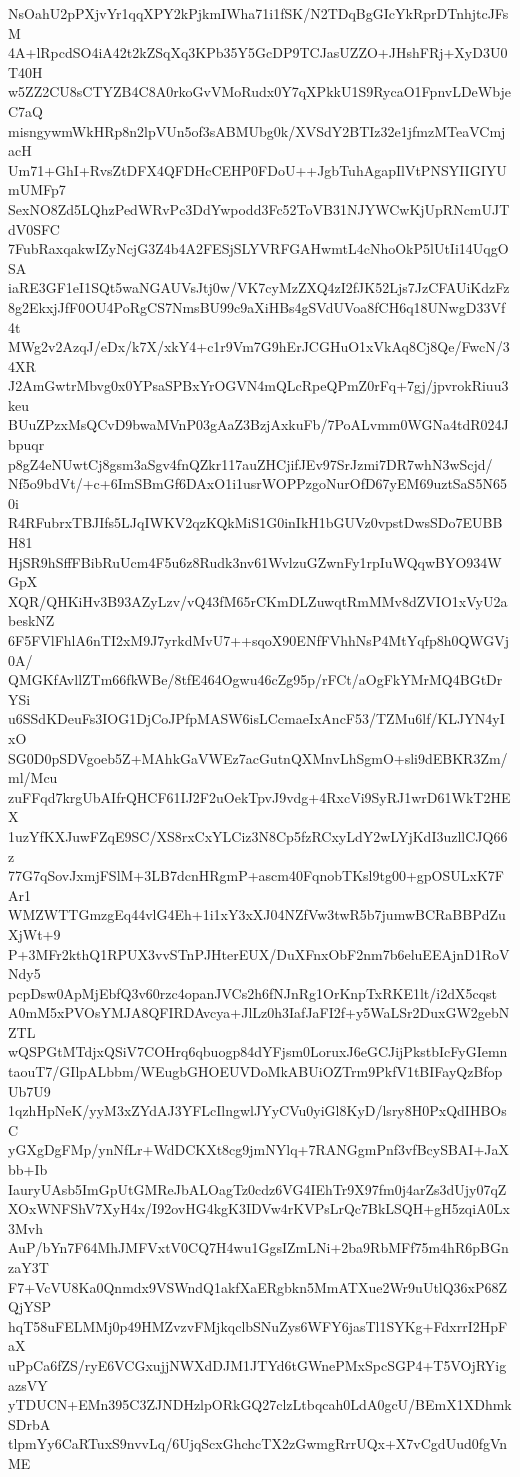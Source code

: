 NsOahU2pPXjvYr1qqXPY2kPjkmIWha71i1fSK/N2TDqBgGIcYkRprDTnhjtcJFsM
4A+lRpcdSO4iA42t2kZSqXq3KPb35Y5GcDP9TCJasUZZO+JHshFRj+XyD3U0T40H
w5ZZ2CU8sCTYZB4C8A0rkoGvVMoRudx0Y7qXPkkU1S9RycaO1FpnvLDeWbjeC7aQ
misngywmWkHRp8n2lpVUn5of3sABMUbg0k/XVSdY2BTIz32e1jfmzMTeaVCmjacH
Um71+GhI+RvsZtDFX4QFDHcCEHP0FDoU++JgbTuhAgapIlVtPNSYIIGIYUmUMFp7
SexNO8Zd5LQhzPedWRvPc3DdYwpodd3Fc52ToVB31NJYWCwKjUpRNcmUJTdV0SFC
7FubRaxqakwIZyNcjG3Z4b4A2FESjSLYVRFGAHwmtL4cNhoOkP5lUtIi14UqgOSA
iaRE3GF1eI1SQt5waNGAUVsJtj0w/VK7cyMzZXQ4zI2fJK52Ljs7JzCFAUiKdzFz
8g2EkxjJfF0OU4PoRgCS7NmsBU99c9aXiHBs4gSVdUVoa8fCH6q18UNwgD33Vf4t
MWg2v2AzqJ/eDx/k7X/xkY4+c1r9Vm7G9hErJCGHuO1xVkAq8Cj8Qe/FwcN/34XR
J2AmGwtrMbvg0x0YPsaSPBxYrOGVN4mQLcRpeQPmZ0rFq+7gj/jpvrokRiuu3keu
BUuZPzxMsQCvD9bwaMVnP03gAaZ3BzjAxkuFb/7PoALvmm0WGNa4tdR024Jbpuqr
p8gZ4eNUwtCj8gsm3aSgv4fnQZkr117auZHCjifJEv97SrJzmi7DR7whN3wScjd/
Nf5o9bdVt/+c+6ImSBmGf6DAxO1i1usrWOPPzgoNurOfD67yEM69uztSaS5N650i
R4RFubrxTBJIfs5LJqIWKV2qzKQkMiS1G0inIkH1bGUVz0vpstDwsSDo7EUBBH81
HjSR9hSffFBibRuUcm4F5u6z8Rudk3nv61WvlzuGZwnFy1rpIuWQqwBYO934WGpX
XQR/QHKiHv3B93AZyLzv/vQ43fM65rCKmDLZuwqtRmMMv8dZVIO1xVyU2abeskNZ
6F5FVlFhlA6nTI2xM9J7yrkdMvU7++sqoX90ENfFVhhNsP4MtYqfp8h0QWGVj0A/
QMGKfAvllZTm66fkWBe/8tfE464Ogwu46cZg95p/rFCt/aOgFkYMrMQ4BGtDrYSi
u6SSdKDeuFs3IOG1DjCoJPfpMASW6isLCcmaeIxAncF53/TZMu6lf/KLJYN4yIxO
SG0D0pSDVgoeb5Z+MAhkGaVWEz7acGutnQXMnvLhSgmO+sli9dEBKR3Zm/ml/Mcu
zuFFqd7krgUbAIfrQHCF61IJ2F2uOekTpvJ9vdg+4RxcVi9SyRJ1wrD61WkT2HEX
1uzYfKXJuwFZqE9SC/XS8rxCxYLCiz3N8Cp5fzRCxyLdY2wLYjKdI3uzllCJQ66z
77G7qSovJxmjFSlM+3LB7dcnHRgmP+ascm40FqnobTKsl9tg00+gpOSULxK7FAr1
WMZWTTGmzgEq44vlG4Eh+1i1xY3xXJ04NZfVw3twR5b7jumwBCRaBBPdZuXjWt+9
P+3MFr2kthQ1RPUX3vvSTnPJHterEUX/DuXFnxObF2nm7b6eluEEAjnD1RoVNdy5
pcpDsw0ApMjEbfQ3v60rzc4opanJVCs2h6fNJnRg1OrKnpTxRKE1lt/i2dX5cqst
A0mM5xPVOsYMJA8QFIRDAvcya+JlLz0h3IafJaFI2f+y5WaLSr2DuxGW2gebNZTL
wQSPGtMTdjxQSiV7COHrq6qbuogp84dYFjsm0LoruxJ6eGCJijPkstbIcFyGIemn
taouT7/GIlpALbbm/WEugbGHOEUVDoMkABUiOZTrm9PkfV1tBIFayQzBfopUb7U9
1qzhHpNeK/yyM3xZYdAJ3YFLcIlngwlJYyCVu0yiGl8KyD/lsry8H0PxQdIHBOsC
yGXgDgFMp/ynNfLr+WdDCKXt8cg9jmNYlq+7RANGgmPnf3vfBcySBAI+JaXbb+Ib
IauryUAsb5ImGpUtGMReJbALOagTz0cdz6VG4IEhTr9X97fm0j4arZs3dUjy07qZ
XOxWNFShV7XyH4x/I92ovHG4kgK3IDVw4rKVPsLrQc7BkLSQH+gH5zqiA0Lx3Mvh
AuP/bYn7F64MhJMFVxtV0CQ7H4wu1GgsIZmLNi+2ba9RbMFf75m4hR6pBGnzaY3T
F7+VcVU8Ka0Qnmdx9VSWndQ1akfXaERgbkn5MmATXue2Wr9uUtlQ36xP68ZQjYSP
hqT58uFELMMj0p49HMZvzvFMjkqclbSNuZys6WFY6jasTl1SYKg+FdxrrI2HpFaX
uPpCa6fZS/ryE6VCGxujjNWXdDJM1JTYd6tGWnePMxSpcSGP4+T5VOjRYigazsVY
yTDUCN+EMn395C3ZJNDHzlpORkGQ27clzLtbqcah0LdA0gcU/BEmX1XDhmkSDrbA
tlpmYy6CaRTuxS9nvvLq/6UjqScxGhchcTX2zGwmgRrrUQx+X7vCgdUud0fgVnME

